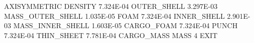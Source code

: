 AXISYMMETRIC
DENSITY
7.324E-04  OUTER_SHELL         
3.297E-03  MASS_OUTER_SHELL    
1.035E-05  FOAM            
7.324E-04  INNER_SHELL     
2.901E-03  MASS_INNER_SHELL
1.603E-05  CARGO_FOAM      
7.324E-04  PUNCH           
7.324E-04  THIN_SHEET          
7.781E-04  CARGO_MASS          
MASS 4
EXIT

